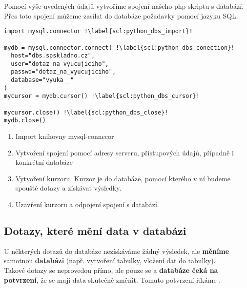 Pomocí výše uvedených údajů vytvoříme spojení našeho php skriptu s databází. Přes toto spojení můžeme zasílat do databáze požadavky pomocí jazyku SQL.\\

\begin{minipage}[t]{.45\textwidth}
\begin{code}
\begin{verbatim}
import mysql.connector !\label{scl:python_dbs_import}!

mydb = mysql.connector.connect( !\label{scl:python_dbs_conection}!
  host="dbs.spskladno.cz",
  user="dotaz_na_vyucujiciho",
  passwd="dotaz_na_vyucujiciho",
  database="vyuka__"
)
mycursor = mydb.cursor() !\label{scl:python_dbs_cursor}!

mycursor.close() !\label{scl:python_dbs_close}!
mydb.close()
\end{verbatim}

\label{code:python_dbs_spojeni}
\end{code}
\end{minipage}
\begin{minipage}[t]{.45\textwidth}
\begin{enumerate}
\item[ř. \ref{scl:python_dbs_import}:] Import knihovny mysql-connecor
\item[ř. \ref{scl:python_dbs_conection}:] Vytvoření spojení pomocí adresy serveru, přístupových údajů, případně i konkrétní databáze 
\item[ř. \ref{scl:python_dbs_cursor}:] Vytvoření kurzoru. Kurzor je  do databáze, pomocí kterého v ní budeme spouště dotazy a získávat výsledky.
\item[ř. \ref{scl:python_dbs_close}:] Uzavření kurzoru a odpojení spojení s databází.
\end{enumerate}
\end{minipage} 

\subsection{Dotazy, které mění data v databázi}
U některých dotazů do databáze nezískáváme žádný výsledek, ale \textbf{měníme} samotnou \textbf{databázi} (např. vytvoření tabulky, vložení dat do tabulky).\\
Takové dotazy se neprovedou přímo, ale pouze se  a \textbf{databáze čeká na potvrzení}, že se mají data skutečně změnit. Tomuto potvrzení říkáme .

